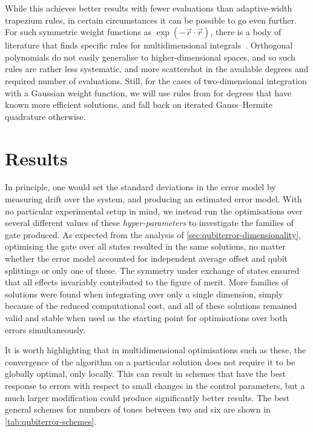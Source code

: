 While this achieves better results with fewer evaluations than adaptive-width trapezium rules, in certain circumstances it can be possible to go even further.
For such symmetric weight functions as $\exp(-\vec r\cdot\vec r)$, there is a body of literature that finds specific rules for multidimensional integrals~\cite{Stroud1971,Cools2003}.
Orthogonal polynomials do not easily generalise to higher-dimensional spaces, and so such rules are rather less systematic, and more scattershot in the available degrees and required number of evaluations.
Still, for the cases of two-dimensional integration with a Gaussian weight function, we will use rules from \citet{Cools2003} for degrees that have known more efficient solutions, and fall back on iterated Gauss--Hermite quadrature otherwise.


\section{Results}

In principle, one would set the standard deviations in the error model by measuring drift over the system, and producing an estimated error model.
With no particular experimental setup in mind, we instead run the optimisations over several different values of these \emph{hyper-parameters} to investigate the families of gate produced.
As expected from the analysis of \cref{sec:qubiterror-dimensionality}, optimising the gate over all states resulted in the same solutions, no matter whether the error model accounted for independent average offset and qubit splittings or only one of these.
The symmetry under exchange of states ensured that all effects invariably contributed to the figure of merit.
More families of solutions were found when integrating over only a single dimension, simply because of the reduced computational cost, and all of these solutions remained valid and stable when used as the starting point for optimisations over both errors simultaneously.

It is worth highlighting that in multidimensional optimisations such as these, the convergence of the algorithm on a particular solution does not require it to be globally optimal, only locally.
This can result in schemes that have the best response to errors with respect to small changes in the control parameters, but a much larger modification could produce significantly better results.
The best general schemes for numbers of tones between two and six are shown in \cref{tab:qubiterror-schemes}.

